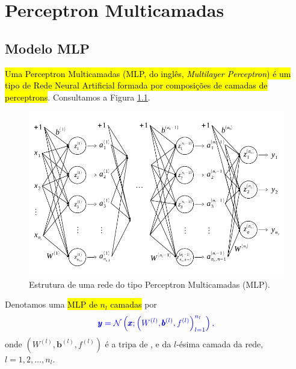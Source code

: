 
\chapter{Perceptron Multicamadas}\label{cap_mlp}
\thispagestyle{fancy}

\section{Modelo MLP}\label{cap_mlp_sec_modelo}

\hl{Uma Perceptron Multicamadas (MLP, do inglês, \textit{Multilayer Perceptron}) é um tipo de Rede Neural Artificial formada por composições de camadas de perceptrons}. Consultamos a Figura \ref{cap_mlp_sec_modelo}.

\begin{figure}[H]
  \centering
  \includegraphics[width=\textwidth]{./cap_mlp/dados/fig_mlp/fig}
  \caption{Estrutura de uma rede do tipo Perceptron Multicamadas (MLP).}
  \label{fig:cap_mlp_sec_modelo:fig:mlp}
\end{figure}

Denotamos uma \hl{MLP de $n_l$ camadas} por
\begin{equation}\color{blue}\pmb{y} = \mathcal{N}\left(\pmb{x}; \left(W^{(l)}, \pmb{b}^{(l)}, f^{(l)}\right)_{l=1}^{n_l}\right),
\end{equation}
onde $\left(W^{(l)}, \pmb{b}^{(l)}, f^{(l)}\right)$ é a tripa de ,  e  da $l$-ésima camada da rede, $l=1, 2, \dotsc, n_l$.

